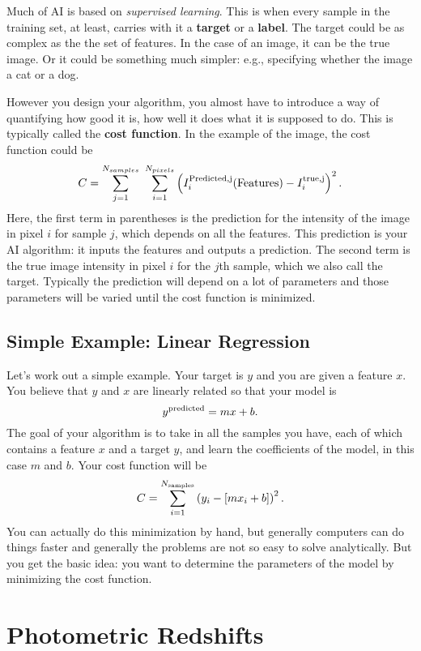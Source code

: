 \documentclass[prd,amsmath,aps,floats,amssymb, floatfix,
  superscriptaddress,nofootinbib]{revtex4-1}
\newcommand{\eql}[1]{\label{eq:#1}}
\numberwithin{equation}{section}
\newcommand\be{\begin{equation}}
\newcommand\ee{\end{equation}}
\begin{document}
Much of AI is based on {\it supervised learning}. This is when every sample in the training set, at least, carries with it a {\bf target} or a {\bf label}. The target could be as complex as the the set of features. In the case of an image, it can be the true image. Or it could be something much simpler: e.g., specifying whether the image a cat or a dog.  

However you design your algorithm, you almost have to introduce a way of quantifying how good it is, how well it does what it is supposed to do. This is typically called the {\bf cost function}. In the example of the image, the cost function could be
\be
C = \sum_{j=1}^{N_{samples}}\ \sum_{i=1}^{N_{pixels}} \left( I^{\rm Predicted,j }_i({\rm Features}) - I^{\rm true, j}_i\right)^2.\eql{cost}\ee
Here, the first term in parentheses is the prediction for the intensity of the image in pixel $i$ for sample $j$, which depends on all the features. This prediction is your AI algorithm: it inputs the features and outputs a prediction. The second term is the true image intensity in pixel $i$ for the $j$th sample, which we also call the target. Typically the prediction will depend on a lot of parameters and those parameters will be varied until the cost function is minimized.  

\subsection{Simple Example: Linear Regression}

Let's work out a simple example. Your target is $y$ and you are given a feature $x$. You believe that $y$ and $x$ are linearly related so that your model is
\be
y^{\rm predicted} = mx+b
.\ee
The goal of your algorithm is to take in all the samples you have, each of which contains a feature $x$ and a target $y$, and learn the coefficients of the model, in this case $m$ and $b$. Your cost function will be
\be
C = \sum_{i=1}^{N_{\rm samples}} \left( y_i - [mx_i+b]\right)^2.\eql{costt}\ee
You can actually do this minimization by hand, but generally computers can do things faster and generally the problems are not so easy to solve analytically. But you get the basic idea: you want to determine the parameters of the model by minimizing the cost function.

\section{Photometric Redshifts}
\end{document}

